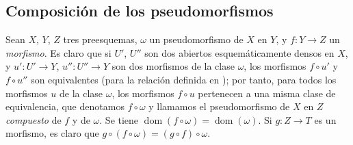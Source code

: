 \subsection{Composición de los pseudomorfismos}
\label{IV.20.3}

\begin{env}[20.3.1]
\label{IV.20.3.1}
Sean $X$, $Y$, $Z$ tres preesquemas, $\omega$ un pseudomorfismo de $X$ en $Y$, y $f:Y\to Z$ un \emph{morfismo}.
Es claro que si $U'$, $U''$ son dos abiertos esquemáticamente densos en $X$, y $u':U'\to Y$, $u'':U''\to Y$ son dos morfismos de la clase $\omega$, los morfismos $f\circ u'$ y $f\circ u''$ son equivalentes (para la relación definida en ); por tanto, para todos los morfismos $u$ de la clase $\omega$, los morfismos $f\circ u$ pertenecen a una misma clase de equivalencia, que denotamos $f\circ\omega$ y llamamos el pseudomorfismo de $X$ en $Z$ \emph{compuesto} de $f$ y de $\omega$.
Se tiene $\operatorname{dom}(f\circ\omega)=\operatorname{dom}(\omega)$.
Si $g:Z\to T$ es un morfismo, es claro que $g\circ(f\circ\omega)=(g\circ f)\circ\omega$.
\end{env}

